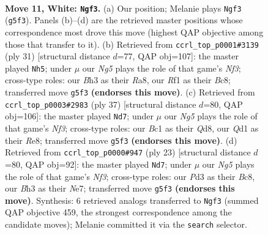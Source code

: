 \documentclass[11pt]{article}
\begin{document}
\clearpage

\begin{figure}[p]\centering
\begin{subfigure}{0.46\textwidth}\centering
\resizebox{\linewidth}{!}{%
\newchessgame
\chessboard[
  setfen={rnbq1rk1/4bp2/4pnp1/pppp2Np/7P/1P1P2PB/P1PNPP2/R1BQ1RK1 w - - 0 11},
  showmover=false,
  pgfstyle=straightmove, color=movearrow, markmove={g5-f3}
]}
\caption{}
\end{subfigure}\hfill
\begin{subfigure}{0.46\textwidth}\centering
\resizebox{\linewidth}{!}{%
\newchessgame
\chessboard[
  setfen={r1bq1r1k/2p1npbp/1p1p1np1/3Pp3/P1P1P3/2NN1P2/3BB1PP/R2Q1RK1 b - - 0 16},
  showmover=false,
  pgfstyle=straightmove, color=movearrow, markmove={f6-h5}
]}
\caption{}
\end{subfigure}
\\[4pt]
\begin{subfigure}{0.46\textwidth}\centering
\resizebox{\linewidth}{!}{%
\newchessgame
\chessboard[
  setfen={2bqr3/4rpbk/pp1p1npp/n1pP4/P1P3P1/RPN4P/3B1PBN/2Q2R1K b - - 4 19},
  showmover=false,
  pgfstyle=straightmove, color=movearrow, markmove={f6-d7}
]}
\caption{}
\end{subfigure}\hfill
\begin{subfigure}{0.46\textwidth}\centering
\resizebox{\linewidth}{!}{%
\newchessgame
\chessboard[
  setfen={r1bq1r1k/2p1npbp/1p1p1np1/p2Pp3/2P1P3/P1N2N2/1PQBBPPP/R4R1K b - - 0 12},
  showmover=false,
  pgfstyle=straightmove, color=movearrow, markmove={f6-d7}
]}
\caption{}
\end{subfigure}
\caption{\textbf{Move 11, White: \texttt{Ngf3}.} (a) Our position; Melanie plays \texttt{Ngf3} (\texttt{g5f3}). Panels (b)--(d) are the retrieved master positions whose correspondence most drove this move (highest QAP objective among those that transfer to it). (b) Retrieved from \texttt{ccrl\_top\_p0001\#3139} (ply 31) [structural distance $d$=77, QAP obj=107]: the master played \texttt{Nh5}; under $\mu$ our \emph{Ng5} plays the role of that game's \emph{Nf3}; cross-type roles: our \emph{B}h3 as their \emph{R}a8, our \emph{R}f1 as their \emph{B}c8; transferred move \texttt{g5f3} \textbf{(endorses this move)}. (c) Retrieved from \texttt{ccrl\_top\_p0003\#2983} (ply 37) [structural distance $d$=80, QAP obj=106]: the master played \texttt{Nd7}; under $\mu$ our \emph{Ng5} plays the role of that game's \emph{Nf3}; cross-type roles: our \emph{B}c1 as their \emph{Q}d8, our \emph{Q}d1 as their \emph{R}e8; transferred move \texttt{g5f3} \textbf{(endorses this move)}. (d) Retrieved from \texttt{ccrl\_top\_p0000\#947} (ply 23) [structural distance $d$=80, QAP obj=92]: the master played \texttt{Nd7}; under $\mu$ our \emph{Ng5} plays the role of that game's \emph{Nf3}; cross-type roles: our \emph{P}d3 as their \emph{B}c8, our \emph{B}h3 as their \emph{N}e7; transferred move \texttt{g5f3} \textbf{(endorses this move)}. Synthesis: 6 retrieved analogs transferred to \texttt{Ngf3} (summed QAP objective 459, the strongest correspondence among the candidate moves); Melanie committed it via the \texttt{search} selector.}
\label{fig:thought-m20}
\end{figure}
\end{document}
